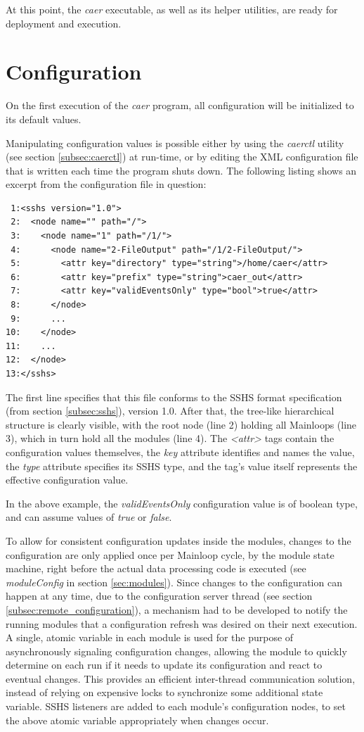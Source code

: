 \documentclass[a4paper,12pt]{report}
\begin{document}
At this point, the \emph{caer} executable, as well as its helper utilities, are ready for deployment and execution.

\section{Configuration} \label{sec:configuration}

On the first execution of the \emph{caer} program, all configuration will be initialized to its default values.

Manipulating configuration values is possible either by using the \emph{caerctl} utility (see section \ref{subsec:caerctl}) at run-time, or by editing the XML configuration file that is written each time the program shuts down.
\clearpage
The following listing shows an excerpt from the configuration file in question:

\begin{lstlisting}
 1:<sshs version="1.0">
 2:  <node name="" path="/">
 3:    <node name="1" path="/1/">
 4:      <node name="2-FileOutput" path="/1/2-FileOutput/">
 5:        <attr key="directory" type="string">/home/caer</attr>
 6:        <attr key="prefix" type="string">caer_out</attr>
 7:        <attr key="validEventsOnly" type="bool">true</attr>
 8:      </node>
 9:      ...
10:    </node>
11:    ...
12:  </node>
13:</sshs>
\end{lstlisting}

The first line specifies that this file conforms to the SSHS format specification (from section \ref{subsec:sshs}), version 1.0.
After that, the tree-like hierarchical structure is clearly visible, with the root node (line 2) holding all Mainloops (line 3), which in turn hold all the modules (line 4).
The \emph{<attr>} tags contain the configuration values themselves, the \emph{key} attribute identifies and names the value, the \emph{type} attribute specifies its SSHS type, and the tag's value itself represents the effective configuration value.

In the above example, the \emph{validEventsOnly} configuration value is of boolean type, and can assume values of \emph{true} or \emph{false}.

To allow for consistent configuration updates inside the modules, changes to the configuration are only applied once per Mainloop cycle, by the module state machine, right before the actual data processing code is executed (see \emph{moduleConfig} in section \ref{sec:modules}).
Since changes to the configuration can happen at any time, due to the configuration server thread (see section \ref{subsec:remote_configuration}), a mechanism had to be developed to notify the running modules that a configuration refresh was desired on their next execution. A single, atomic variable in each module is used for the purpose of asynchronously signaling configuration changes, allowing the module to quickly determine on each run if it needs to update its configuration and react to eventual changes. This provides an efficient inter-thread communication solution, instead of relying on expensive locks to synchronize some additional state variable.
SSHS listeners are added to each module's configuration nodes, to set the above atomic variable appropriately when changes occur.
\end{document}
